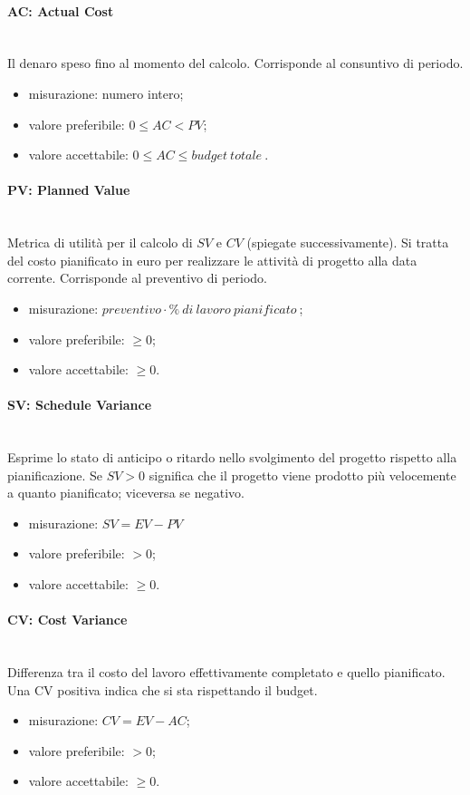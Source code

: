 \paragraph*{AC: Actual Cost}\mbox{}\\
Il denaro speso fino al momento del calcolo. Corrisponde al consuntivo di periodo.
\begin{itemize}
	\item  misurazione: numero intero;
	\item  valore preferibile: $0 \leq AC < PV$;
	\item  valore accettabile: $0 \leq AC \leq budget\ totale\ $.
\end{itemize}

\paragraph*{PV: Planned Value}\mbox{}\\
Metrica di utilità per il calcolo di $SV$ e $CV$ (spiegate successivamente). Si tratta del costo pianificato in euro per realizzare le attività di progetto alla data corrente. Corrisponde al preventivo di periodo.
\begin{itemize}
	\item  misurazione: $preventivo \cdot \%\ di\ lavoro\ pianificato\ $;
	\item  valore preferibile: $ \geq 0$;
	\item  valore accettabile: $ \geq 0$.
\end{itemize}			
\paragraph*{SV: Schedule Variance}\mbox{}\\
Esprime lo stato di anticipo o ritardo nello svolgimento del progetto rispetto alla pianificazione.
Se $SV > 0$ significa che il progetto viene prodotto più velocemente a quanto pianificato; viceversa se negativo.
\begin{itemize}
	\item misurazione: $SV = EV - PV$
	\item valore preferibile: $ > 0$;
	\item valore accettabile: $\geq 0$.
\end{itemize}
\paragraph*{CV: Cost Variance}\mbox{}\\
Differenza tra il costo del lavoro effettivamente completato e quello pianificato. Una CV positiva indica che si sta rispettando il budget.
\begin{itemize}
	\item misurazione: $CV = EV - AC$;
	\item valore preferibile: $ > 0$;
	\item valore accettabile: $ \geq 0$.
\end{itemize}

